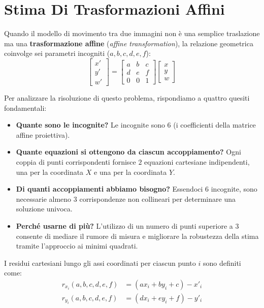 ﻿\documentclass[11pt, a4paper]{article}
\begin{document}
\newpage

\section{Stima Di Trasformazioni Affini}

Quando il modello di movimento tra due immagini non è una semplice traslazione ma una \textbf{trasformazione affine} (\emph{affine transformation}), la relazione geometrica coinvolge sei parametri incogniti ($a, b, c, d, e, f$):
\[
\begin{bmatrix}
x' \\
y' \\
w'
\end{bmatrix}
=
\begin{bmatrix}
a & b & c \\
d & e & f \\
0 & 0 & 1
\end{bmatrix}
\begin{bmatrix}
x \\
y \\
w
\end{bmatrix}
\]

Per analizzare la risoluzione di questo problema, rispondiamo a quattro quesiti fondamentali:
\begin{itemize}[noitemsep]
    \item \textbf{Quante sono le incognite?} Le incognite sono $6$ (i coefficienti della matrice affine proiettiva).
    \item \textbf{Quante equazioni si ottengono da ciascun accoppiamento?} Ogni coppia di punti corrispondenti fornisce $2$ equazioni cartesiane indipendenti, una per la coordinata $X$ e una per la coordinata $Y$.
    \item \textbf{Di quanti accoppiamenti abbiamo bisogno?} Essendoci $6$ incognite, sono necessarie almeno $3$ corrispondenze non collineari per determinare una soluzione univoca.
    \item \textbf{Perché usarne di più?} L'utilizzo di un numero di punti superiore a $3$ consente di mediare il rumore di misura e migliorare la robustezza della stima tramite l'approccio ai minimi quadrati.
\end{itemize}

I residui cartesiani lungo gli assi coordinati per ciascun punto $i$ sono definiti come:
\[
\begin{aligned}
r_{x_i}(a, b, c, d, e, f) &= (ax_i + by_i + c) - x'_i \\
r_{y_i}(a, b, c, d, e, f) &= (dx_i + ey_i + f) - y'_i
\end{aligned}
\]
\end{document}
